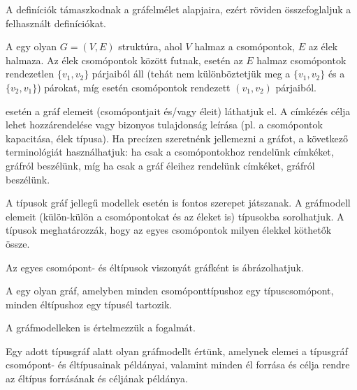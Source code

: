 \begin{kisdefiniciok}
	A definíciók támaszkodnak a gráfelmélet alapjaira, ezért röviden összefoglaljuk a felhasznált definíciókat.
	
	A  egy olyan $G = (V, E)$ struktúra, ahol $V$ halmaz a csomópontok, $E$ az élek halmaza. Az élek csomópontok között futnak,  esetén az $E$ halmaz csomópontok rendezetlen $\{v_1, v_2\}$ párjaiból áll (tehát nem különböztetjük meg a $\{v_1, v_2\}$ és a $\{v_2, v_1\}$) párokat, míg  esetén csomópontok rendezett $(v_1, v_2)$ párjaiból.
	
	 esetén a gráf elemeit (csomópontjait és/vagy éleit)  láthatjuk el. A címkézés célja lehet  hozzárendelése vagy bizonyos tulajdonság leírása (pl. a csomópontok kapacitása, élek típusa). Ha precízen szeretnénk jellemezni a gráfot, a következő terminológiát használhatjuk: ha csak a csomópontokhoz rendelünk címkéket,  gráfról beszélünk, míg ha csak a gráf éleihez rendelünk címkéket,  gráfról beszélünk. 
	
\end{kisdefiniciok}

A típusok gráf jellegű modellek esetén is fontos szerepet játszanak. A gráfmodell elemeit (külön-külön a csomópontokat és az éleket is) típusokba sorolhatjuk. A típusok meghatározzák, hogy az egyes csomópontok milyen élekkel köthetők össze.

Az egyes csomópont- és éltípusok viszonyát gráfként is ábrázolhatjuk.

\begin{definicio}
	A  egy olyan gráf, amelyben minden csomóponttípushoz egy típuscsomópont, minden éltípushoz egy típusél tartozik.
\end{definicio}

A gráfmodelleken is értelmezzük a  fogalmát.

\begin{definicio}
	Egy adott típusgráf  alatt olyan gráfmodellt értünk, amelynek elemei a típusgráf csomópont- és éltípusainak példányai, valamint minden él forrása és célja rendre az éltípus forrásának és céljának példánya.
\end{definicio}


